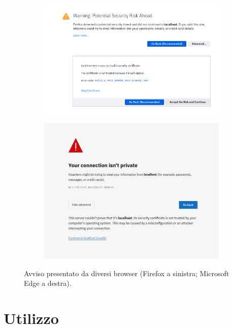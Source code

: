 \documentclass[conference,onecolumn,a4paper]{IEEEtran}
\begin{document}
{\begin{figure}[H]
    \centering
    \begin{subfigure}[b]{0.4\linewidth}
        \includegraphics[width=\linewidth]{resources/firefox-warning.png}
    \end{subfigure}
    \begin{subfigure}[b]{0.3\linewidth}
        \includegraphics[width=\linewidth]{resources/edge-warning.png}
    \end{subfigure}
    \caption{Avviso presentato da diversi browser (Firefox a sinistra; Microsoft Edge a destra).}
\end{figure}

\section{Utilizzo}

}
\end{document}
